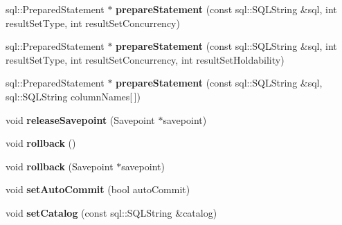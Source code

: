 \begin{DoxyCompactItemize}
\item 
sql\+::\+Prepared\+Statement $\ast$ {\bfseries prepare\+Statement} (const sql\+::\+S\+Q\+L\+String \&sql, int result\+Set\+Type, int result\+Set\+Concurrency)\hypertarget{classsql_1_1mysql_1_1MySQL__Connection_afcddea07aca0542a2a6e814ba1ee4bd6}{}\label{classsql_1_1mysql_1_1MySQL__Connection_afcddea07aca0542a2a6e814ba1ee4bd6}

\item 
sql\+::\+Prepared\+Statement $\ast$ {\bfseries prepare\+Statement} (const sql\+::\+S\+Q\+L\+String \&sql, int result\+Set\+Type, int result\+Set\+Concurrency, int result\+Set\+Holdability)\hypertarget{classsql_1_1mysql_1_1MySQL__Connection_a156ab360753b8b1ca11682422d9914b3}{}\label{classsql_1_1mysql_1_1MySQL__Connection_a156ab360753b8b1ca11682422d9914b3}

\item 
sql\+::\+Prepared\+Statement $\ast$ {\bfseries prepare\+Statement} (const sql\+::\+S\+Q\+L\+String \&sql, sql\+::\+S\+Q\+L\+String column\+Names\mbox{[}$\,$\mbox{]})\hypertarget{classsql_1_1mysql_1_1MySQL__Connection_a27a07ce9777574a0592fe6f8834e082f}{}\label{classsql_1_1mysql_1_1MySQL__Connection_a27a07ce9777574a0592fe6f8834e082f}

\item 
void {\bfseries release\+Savepoint} (Savepoint $\ast$savepoint)\hypertarget{classsql_1_1mysql_1_1MySQL__Connection_af85e740e1d7cc9f16d357afdd9f4419d}{}\label{classsql_1_1mysql_1_1MySQL__Connection_af85e740e1d7cc9f16d357afdd9f4419d}

\item 
void {\bfseries rollback} ()\hypertarget{classsql_1_1mysql_1_1MySQL__Connection_a30102a74e65a62cff9c36ce77a8c7f44}{}\label{classsql_1_1mysql_1_1MySQL__Connection_a30102a74e65a62cff9c36ce77a8c7f44}

\item 
void {\bfseries rollback} (Savepoint $\ast$savepoint)\hypertarget{classsql_1_1mysql_1_1MySQL__Connection_a64fc3a6f403a19fee712142141a07ef4}{}\label{classsql_1_1mysql_1_1MySQL__Connection_a64fc3a6f403a19fee712142141a07ef4}

\item 
void {\bfseries set\+Auto\+Commit} (bool auto\+Commit)\hypertarget{classsql_1_1mysql_1_1MySQL__Connection_a66dd8515ee9ccfe186fc1d2b597f220f}{}\label{classsql_1_1mysql_1_1MySQL__Connection_a66dd8515ee9ccfe186fc1d2b597f220f}

\item 
void {\bfseries set\+Catalog} (const sql\+::\+S\+Q\+L\+String \&catalog)\hypertarget{classsql_1_1mysql_1_1MySQL__Connection_a85487982563f163064269bbe072bf2a0}{}\label{classsql_1_1mysql_1_1MySQL__Connection_a85487982563f163064269bbe072bf2a0}


\end{DoxyCompactItemize}
